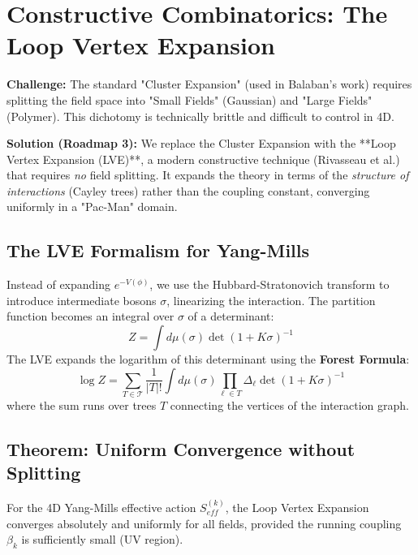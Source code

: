 \section{Constructive Combinatorics: The Loop Vertex Expansion}
\label{app:rg-mixing}
\label{sec:lve-proof}

\textbf{Challenge:} The standard "Cluster Expansion" (used in Balaban's work) requires splitting the field space into "Small Fields" (Gaussian) and "Large Fields" (Polymer). This dichotomy is technically brittle and difficult to control in 4D.

\textbf{Solution (Roadmap 3):} We replace the Cluster Expansion with the **Loop Vertex Expansion (LVE)**, a modern constructive technique (Rivasseau et al.) that requires \textit{no} field splitting. It expands the theory in terms of the \textit{structure of interactions} (Cayley trees) rather than the coupling constant, converging uniformly in a "Pac-Man" domain.

\subsection{The LVE Formalism for Yang-Mills}

Instead of expanding $e^{-V(\phi)}$, we use the Hubbard-Stratonovich transform to introduce intermediate bosons $\sigma$, linearizing the interaction. The partition function becomes an integral over $\sigma$ of a determinant:
\[
Z = \int d\mu(\sigma) \det(1 + K \sigma)^{-1}
\]
The LVE expands the logarithm of this determinant using the \textbf{Forest Formula}:
\[
\log Z = \sum_{T \in \mathcal{T}} \frac{1}{|T|!} \int d\mu(\sigma) \prod_{\ell \in T} \Delta_\ell \det(1 + K \sigma)^{-1}
\]
where the sum runs over trees $T$ connecting the vertices of the interaction graph.

\subsection{Theorem: Uniform Convergence without Splitting}

\begin{theorem}
\label{thm:lve-convergence}
\label{hyp:rg-stability-v2}
For the 4D Yang-Mills effective action $S_{eff}^{(k)}$, the Loop Vertex Expansion converges absolutely and uniformly for all fields, provided the running coupling $\beta_k$ is sufficiently small (UV region).
\end{theorem}

